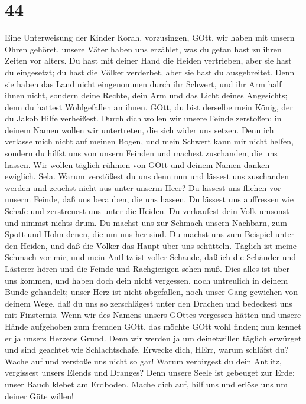 \hypertarget{section-43}{%
\section{44}\label{section-43}}

 Eine Unterweisung der Kinder Korah, vorzusingen,
 GOtt, wir haben mit unsern Ohren gehöret, unsere Väter
haben uns erzählet, was du getan hast zu ihren Zeiten vor alters.
 Du hast mit deiner Hand die Heiden vertrieben, aber sie
hast du eingesetzt; du hast die Völker verderbet, aber sie hast du
ausgebreitet.  Denn sie haben das Land nicht eingenommen
durch ihr Schwert, und ihr Arm half ihnen nicht, sondern deine Rechte,
dein Arm und das Licht deines Angesichts; denn du hattest Wohlgefallen
an ihnen.  GOtt, du bist derselbe mein König, der du Jakob
Hilfe verheißest.  Durch dich wollen wir unsere Feinde
zerstoßen; in deinem Namen wollen wir untertreten, die sich wider uns
setzen.  Denn ich verlasse mich nicht auf meinen Bogen, und
mein Schwert kann mir nicht helfen,  sondern du hilfst uns
von unsern Feinden und machest zuschanden, die uns hassen. 
Wir wollen täglich rühmen von GOtt und deinem Namen danken ewiglich.
Sela.  Warum verstößest du uns denn nun und lässest uns
zuschanden werden und zeuchst nicht aus unter unserm Heer? 
Du lässest uns fliehen vor unserm Feinde, daß uns berauben, die uns
hassen.  Du lässest uns auffressen wie Schafe und
zerstreuest uns unter die Heiden.  Du verkaufest dein Volk
umsonst und nimmst nichts drum.  Du machst uns zur Schmach
unsern Nachbarn, zum Spott und Hohn denen, die um uns her sind.
 Du machst uns zum Beispiel unter den Heiden, und daß die
Völker das Haupt über uns schütteln.  Täglich ist meine
Schmach vor mir, und mein Antlitz ist voller Schande,  daß
ich die Schänder und Lästerer hören und die Feinde und Rachgierigen
sehen muß.  Dies alles ist über uns kommen, und haben doch
dein nicht vergessen, noch untreulich in deinem Bunde gehandelt;
 unser Herz ist nicht abgefallen, noch unser Gang gewichen
von deinem Wege,  daß du uns so zerschlägest unter den
Drachen und bedeckest uns mit Finsternis.  Wenn wir des
Namens unsers GOttes vergessen hätten und unsere Hände aufgehoben zum
fremden GOtt,  das möchte GOtt wohl finden; nun kennet er
ja unsers Herzens Grund.  Denn wir werden ja um
deinetwillen täglich erwürget und sind geachtet wie Schlachtschafe.
 Erwecke dich, HErr, warum schläfst du? Wache auf und
verstoße uns nicht so gar!  Warum verbirgest du dein
Antlitz, vergissest unsers Elends und Dranges?  Denn unsere
Seele ist gebeuget zur Erde; unser Bauch klebet am Erdboden.
 Mache dich auf, hilf uns und erlöse uns um deiner Güte
willen!

